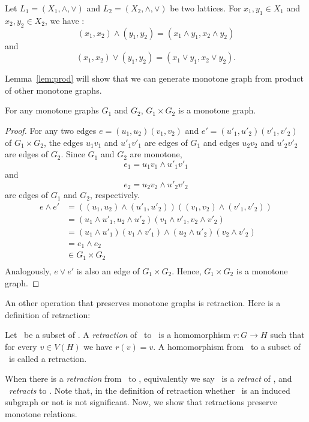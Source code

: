 \begin{rem}
Let \(L_1=(X_1,\wedge,\vee)\) and \(L_2=(X_2,\wedge,\vee)\) be two lattices.
For \(x_1,y_1 \in X_1\) and \(x_2,y_2\in X_2\), we have :
\[(x_1,x_2)\wedge (y_1,y_2) = (x_1\wedge y_1, x_2 \wedge y_2) \]
and \[(x_1,x_2)\vee (y_1,y_2) = (x_1\vee y_1, x_2 \vee y_2).\]
\end{rem}

Lemma~\ref{lem:prod} will show that we can generate monotone graph from product of other
monotone graphs.

\begin{lemma}\label{lem:prod}
For any monotone graphs \(G_1\) and \(G_2\), \(G_1 \times G_2\) is a monotone graph.
\end{lemma}

\begin{proof}
For any two edges \(e = (u_1,u_2)(v_1,v_2)\) and \(e' =(u'_1,u'_2)(v'_1,v'_2)\) of \(G_1\times G_2\),
the edges \(u_1v_1\) and \(u'_1v'_1\) are edges of \(G_1\) and
edges \(u_2v_2\) and \(u'_2v'_2\) are edges of \(G_2\)\@.
Since \(G_1\) and \(G_2\) are monotone,
\[e_1 = u_1v_1 \wedge u'_1v'_1\]
and
\[e_2 = u_2v_2 \wedge u'_2v'_2\]
are edges of \(G_1\) and \(G_2\), respectively.
\begin{align*}
e \wedge e' &= ((u_1,u_2)\wedge(u'_1,u'_2))((v_1,v_2)\wedge(v'_1,v'_2)) \\
&= (u_1\wedge u'_1,u_2 \wedge u'_2)(v_1\wedge v'_1,v_2 \wedge v'_2) \\
&= (u_1\wedge u'_1)(v_1\wedge v'_1) \wedge (u_2\wedge u'_2)(v_2\wedge v'_2) \\
&= e_1 \wedge e_2 \\
&\in G_1 \times G_2 \\
\end{align*}
Analogously, \(e \vee e'\) is also an edge of \(G_1\times G_2\)\@. Hence, \(G_1\times G_2\)
is a monotone graph.
\end{proof}

An other operation that preserves monotone graphs is retraction. Here is a definition
of retraction:

\begin{defi} [Retraction]
Let \mH\ be a subset of \mG\@. A \emph{retraction} of \mG\ to \mH\ is a 
homomorphism \(r: G\to H\) such that for every \(v\in V(H)\) we have
\(r(v) = v\)\@.
A homomorphism from \mG\ to a subset of \mG\ is called a retraction.
\end{defi}
When there is a \emph{retraction} from \mH\ to \mG, equivalently we say
\mH\ is a \emph{retract} of \mG, and \mG\ \emph{retracts} to \mH\@.
Note that, in the definition of retraction whether \mH\ is an induced subgraph or not 
is not significant. Now, we show that retractions preserve monotone relations.

